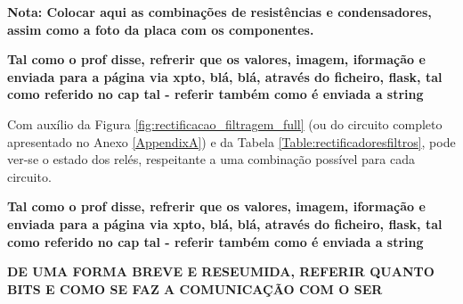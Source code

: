 \textbf{Nota: Colocar aqui as combinações de resistências e condensadores, assim como a foto da placa com os componentes.}

\textbf{Tal como o prof disse, refrerir que os valores, imagem, iformação e enviada para a página via xpto, blá, blá, através do ficheiro, flask, tal como referido no cap tal - referir também como é enviada a string}


Com auxílio da Figura \ref{fig:rectificacao_filtragem_full} (ou do circuito completo apresentado no Anexo \ref{AppendixA}) e da Tabela \ref{Table:rectificadoresfiltros}, pode ver-se o estado dos relés, respeitante a uma combinação possível para cada circuito. 

\begin{table}[htb]
	\centering
	\caption{Exemplo funcionamento do rectificador de meia onda} 
	\label{Table:rectificadoresfiltros}
\end{table}

\textbf{Tal como o prof disse, refrerir que os valores, imagem, iformação e enviada para a página via xpto, blá, blá, através do ficheiro, flask, tal como referido no cap tal - referir também como é enviada a string}

\textbf{DE UMA FORMA BREVE E RESEUMIDA, REFERIR QUANTO BITS E COMO SE FAZ A COMUNICAÇÃO COM O SER}


